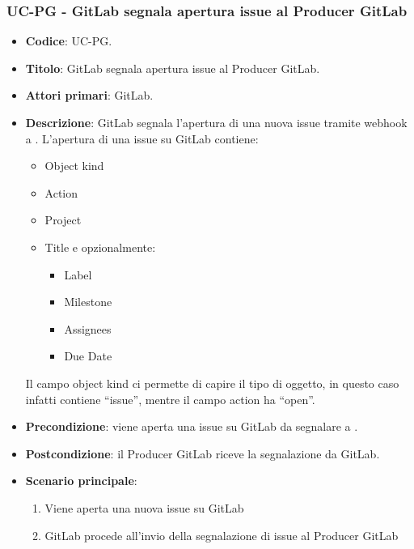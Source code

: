 \subsubsection{UC\theuccount-PG - GitLab segnala apertura issue al Producer GitLab}
	\begin{itemize}
		\item \textbf{Codice}: UC\theuccount-PG.
		\item \textbf{Titolo}: GitLab segnala apertura issue al Producer GitLab.
		\item \textbf{Attori primari}: GitLab.
		\item \textbf{Descrizione}: GitLab segnala l'apertura di una nuova issue tramite webhook a \progetto.
		L'apertura di una issue su GitLab contiene:
		\begin{itemize}
			\item Object kind
			\item Action
			\item Project
			\item Title e opzionalmente:
			\begin{itemize}
				\item Label
				\item Milestone
				\item Assignees
				\item Due Date
			\end{itemize}
		\end{itemize}
		Il campo object kind ci permette di capire il tipo di oggetto, in questo caso infatti contiene ``issue'', mentre il campo action ha ``open''.
		\item \textbf{Precondizione}: viene aperta una issue su GitLab da 
		segnalare a \progetto.
		\item \textbf{Postcondizione}: il Producer GitLab riceve la segnalazione da GitLab.
		\item \textbf{Scenario principale}: 
		\begin{enumerate}
			\item Viene aperta una nuova issue su GitLab
			\item GitLab procede all'invio della segnalazione di issue al Producer GitLab
		\end{enumerate}
		
	\end{itemize}
